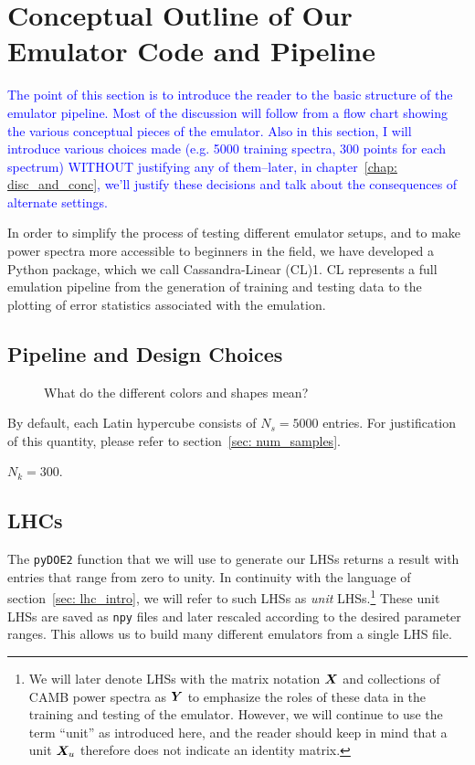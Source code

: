 \chapter{Conceptual Outline of Our Emulator Code and Pipeline}

\textcolor{blue}{The point of this section is to introduce the reader to the
basic structure of the emulator pipeline. Most of the discussion will follow
from a flow chart showing the various conceptual pieces of the emulator. Also
in this section, I will introduce various choices made (e.g. 5000 training
spectra, 300 points for each spectrum) WITHOUT justifying any of them--later,
in chapter~\ref{chap: disc_and_conc}, we'll justify these decisions and
talk about the consequences of alternate settings.}

In order to simplify the process of testing different emulator setups, and to 
make power spectra more accessible to beginners in the field, we have 
developed a Python package, which we call Cassandra-Linear (CL)1. CL 
represents a full emulation pipeline from the generation of training and 
testing data to the plotting of error statistics associated with
the emulation.


\section{Pipeline and Design Choices}

\begin{figure}[ht!]
    \centering
 	
 	\caption{What do the different colors and shapes mean?}
 	\label{fig: flow_chart}
\end{figure}

By default, each Latin hypercube consists of $N_s = 5000$ entries. For 
justification of this quantity, please refer to
section~\ref{sec: num_samples}.

$N_k = 300$.


\section{LHCs}
\label{sec: lhc_outline}

The \verb|pyDOE2| function that we will use to generate our LHSs
returns a result with entries that range from zero to unity. In continuity
with the language of section~\ref{sec: lhc_intro}, we will refer
to such LHSs as \textit{unit} LHSs.\footnote{We will later denote LHSs with 
the matrix notation $\bm{X}$ and collections of CAMB power spectra as
$\bm{Y}$ to
emphasize the roles of these data in the training and testing of the emulator. 
However, we will continue to use the term ``unit'' as introduced here, and 
the reader should keep in mind that a unit $\bm{X}_u$ therefore does not
indicate an identity matrix.} These unit LHSs are saved as \verb|npy| files
and later rescaled according to the desired parameter ranges. This allows us
to build many different emulators from a single LHS file.

